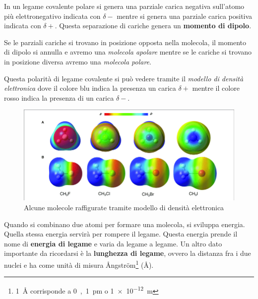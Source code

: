 In un legame covalente polare si genera una parziale carica negativa sull'atomo più elettronegativo indicata con \(\delta-\) mentre si genera una parziale carica positiva indicata con \(\delta+\). Questa separazione di cariche genera un \textbf{momento di dipolo}.

Se le parziali cariche si trovano in posizione opposta nella molecola, il momento di dipolo si annulla e avremo una \textit{molecola apolare} mentre se le cariche si trovano in posizione diversa avremo una \textit{molecola polare}.


Questa polarità di legame covalente si può vedere tramite il \textit{modello di densità elettronica} dove il colore blu indica la presenza un carica \(\delta+\) mentre il colore rosso indica la presenza di un carica \(\delta-\).

\begin{figure}[H]
	\includegraphics[width=\textwidth,trim={3cm 0 2cm 1cm},clip,]{immagini/electron density model.png}
	\caption{Alcune molecole raffigurate tramite modello di densità elettronica}
\end{figure}

Quando si combinano due atomi per formare una molecola, si sviluppa energia. Quella stessa energia servirà per rompere il legame. Questa energia prende il nome di \textbf{energia di legame} e varia da legame a legame. Un altro dato importante da ricordarsi è la \textbf{lunghezza di legame}, ovvero la distanza fra i due nuclei e ha come unità di misura {\AA}ngstr\"{o}m\footnote{\si{1 \angstrom} corrisponde a \si{0,1\pm} o \si{\qty{1e-12}\m}} (\si{\angstrom}).

